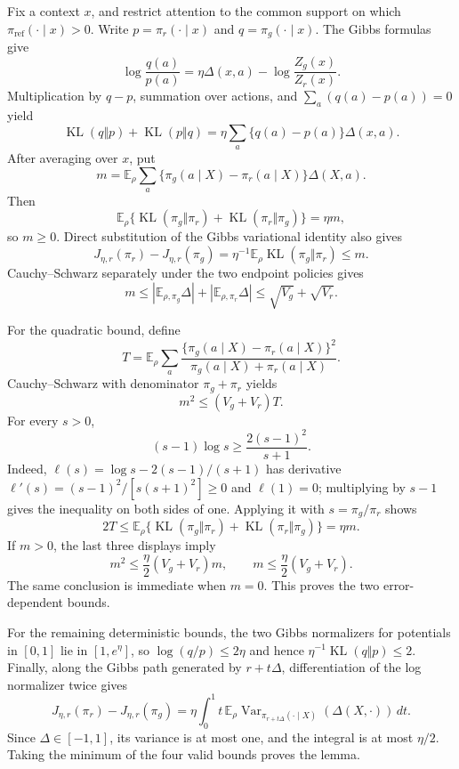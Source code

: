 Fix a context \(x\), and restrict attention to the common support on which \(\pi_{\mathrm{ref}}(\cdot\mid x)>0\). Write \(p=\pi_r(\cdot\mid x)\) and \(q=\pi_g(\cdot\mid x)\). The Gibbs formulas give
\[
\log\frac{q(a)}{p(a)}
=\eta\Delta(x,a)-\log\frac{Z_g(x)}{Z_r(x)}.
\]
Multiplication by \(q-p\), summation over actions, and \(\sum_a(q(a)-p(a))=0\) yield
\[
\operatorname{KL}(q\Vert p)+\operatorname{KL}(p\Vert q)
=\eta\sum_a\{q(a)-p(a)\}\Delta(x,a).
\]
After averaging over \(x\), put
\[
m=\mathbb E_\rho\sum_a\{\pi_g(a\mid X)-\pi_r(a\mid X)\}\Delta(X,a).
\]
Then
\[
\mathbb E_\rho\{\operatorname{KL}(\pi_g\Vert\pi_r)+\operatorname{KL}(\pi_r\Vert\pi_g)\}=\eta m,
\]
so \(m\ge0\). Direct substitution of the Gibbs variational identity also gives
\[
J_{\eta,r}(\pi_r)-J_{\eta,r}(\pi_g)
=\eta^{-1}\mathbb E_\rho\operatorname{KL}(\pi_g\Vert\pi_r)
\le m.
\]
Cauchy--Schwarz separately under the two endpoint policies gives
\[
m\le|\mathbb E_{\rho,\pi_g}\Delta|+|\mathbb E_{\rho,\pi_r}\Delta|
\le\sqrt{V_g}+\sqrt{V_r}.
\]

For the quadratic bound, define
\[
T=\mathbb E_\rho\sum_a\frac{\{\pi_g(a\mid X)-\pi_r(a\mid X)\}^2}{\pi_g(a\mid X)+\pi_r(a\mid X)}.
\]
Cauchy--Schwarz with denominator \(\pi_g+\pi_r\) yields
\[
m^2\le(V_g+V_r)T.
\]
For every \(s>0\),
\[
(s-1)\log s\ge\frac{2(s-1)^2}{s+1}.
\]
Indeed, \(\ell(s)=\log s-2(s-1)/(s+1)\) has derivative \(\ell'(s)=(s-1)^2/[s(s+1)^2]\ge0\) and \(\ell(1)=0\); multiplying by \(s-1\) gives the inequality on both sides of one. Applying it with \(s=\pi_g/\pi_r\) shows
\[
2T\le\mathbb E_\rho\{\operatorname{KL}(\pi_g\Vert\pi_r)+\operatorname{KL}(\pi_r\Vert\pi_g)\}=\eta m.
\]
If \(m>0\), the last three displays imply
\[
m^2\le\frac\eta2(V_g+V_r)m,
\qquad
m\le\frac\eta2(V_g+V_r).
\]
The same conclusion is immediate when \(m=0\). This proves the two error-dependent bounds.

For the remaining deterministic bounds, the two Gibbs normalizers for potentials in \([0,1]\) lie in \([1,e^\eta]\), so \(\log(q/p)\le2\eta\) and hence \(\eta^{-1}\operatorname{KL}(q\Vert p)\le2\). Finally, along the Gibbs path generated by \(r+t\Delta\), differentiation of the log normalizer twice gives
\[
J_{\eta,r}(\pi_r)-J_{\eta,r}(\pi_g)
=\eta\int_0^1t\,\mathbb E_\rho\operatorname{Var}_{\pi_{r+t\Delta}(\cdot\mid X)}(\Delta(X,\cdot))\,dt.
\]
Since \(\Delta\in[-1,1]\), its variance is at most one, and the integral is at most \(\eta/2\). Taking the minimum of the four valid bounds proves the lemma.